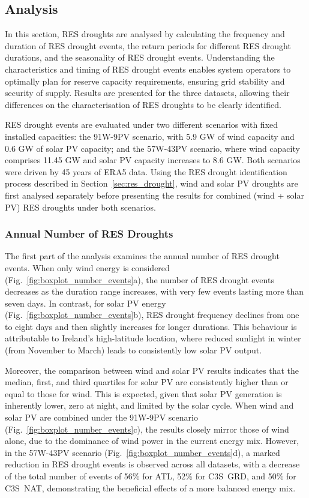 \documentclass[preprint, 12pt]{elsarticle}
\begin{document}
\subsection{Analysis}
\label{sec:analysis}

In this section, RES droughts are analysed by calculating the frequency and duration of RES drought events, the return periods for different RES drought durations, and the seasonality of RES drought events. Understanding the characteristics and timing of RES drought events enables system operators to optimally plan for reserve capacity requirements, ensuring grid stability and security of supply. Results are presented for the three datasets, allowing their differences on the characterisation of RES droughts to be clearly identified.

RES drought events are evaluated under two different scenarios with fixed installed capacities: the 91W-9PV scenario, with 5.9 GW of wind capacity and 0.6 GW of solar PV capacity; and the 57W-43PV scenario, where wind capacity comprises 11.45 GW and solar PV capacity increases to 8.6 GW. Both scenarios were driven by 45 years of ERA5 data. Using the RES drought identification process described in Section~\ref{sec:res_drought}, wind and solar PV droughts are first analysed separately before presenting the results for combined (wind + solar PV) RES droughts under both scenarios.

\subsubsection{Annual Number of RES Droughts}

The first part of the analysis examines the annual number of RES drought events. When only wind energy is considered (Fig.~\ref{fig:boxplot_number_events}a), the number of RES drought events decreases as the duration range increases, with very few events lasting more than seven days. In contrast, for solar PV energy (Fig.~\ref{fig:boxplot_number_events}b), RES drought frequency declines from one to eight days and then slightly increases for longer durations. This behaviour is attributable to Ireland's high-latitude location, where reduced sunlight in winter (from November to March) leads to consistently low solar PV output.

Moreover, the comparison between wind and solar PV results indicates that the median, first, and third quartiles for solar PV are consistently higher than or equal to those for wind. This is expected, given that solar PV generation is inherently lower, zero at night, and limited by the solar cycle. When wind and solar PV are combined under the 91W-9PV scenario (Fig.~\ref{fig:boxplot_number_events}c), the results closely mirror those of wind alone, due to the dominance of wind power in the current energy mix. However, in the 57W-43PV scenario (Fig.~\ref{fig:boxplot_number_events}d), a marked reduction in RES drought events is observed across all datasets, with a decrease of the total number of events of 56\% for ATL, 52\% for C3S~GRD, and 50\% for C3S~NAT, demonstrating the beneficial effects of a more balanced energy mix.
\end{document}
